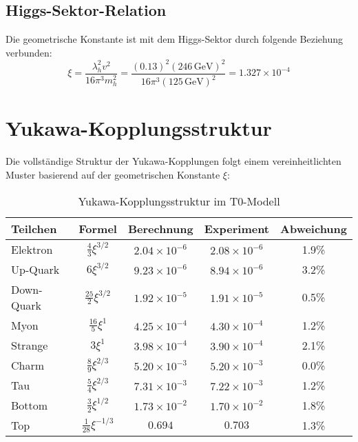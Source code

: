 \documentclass[12pt,a4paper]{article}
\newcommand{\xigeom}{\xi}
\begin{document}
	\subsection{Higgs-Sektor-Relation}
	
	Die geometrische Konstante ist mit dem Higgs-Sektor durch folgende Beziehung verbunden:
	\begin{equation}
		\xigeom = \frac{\lambda_h^2 v^2}{16\pi^3 m_h^2} = \frac{(0.13)^2 (246\,\text{GeV})^2}{16\pi^3 (125\,\text{GeV})^2} = 1.327 \times 10^{-4}
	\end{equation}
	
	\section{Yukawa-Kopplungsstruktur}
	
	Die vollständige Struktur der Yukawa-Kopplungen folgt einem vereinheitlichten Muster basierend auf der geometrischen Konstante $\xigeom$:
	
	\begin{table}[H]
		\centering
		\caption{Yukawa-Kopplungsstruktur im T0-Modell}
		\begin{tabular}{@{}lcccc@{}}
			\toprule
			\textbf{Teilchen} & \textbf{Formel} & \textbf{Berechnung} & \textbf{Experiment} & \textbf{Abweichung} \\
			\midrule
			Elektron & $\frac{4}{3}\xigeom^{3/2}$ & $2.04 \times 10^{-6}$ & $2.08 \times 10^{-6}$ & 1.9\% \\
			Up-Quark & $6\xigeom^{3/2}$ & $9.23 \times 10^{-6}$ & $8.94 \times 10^{-6}$ & 3.2\% \\
			Down-Quark & $\frac{25}{2}\xigeom^{3/2}$ & $1.92 \times 10^{-5}$ & $1.91 \times 10^{-5}$ & 0.5\% \\
			Myon & $\frac{16}{5}\xigeom^1$ & $4.25 \times 10^{-4}$ & $4.30 \times 10^{-4}$ & 1.2\% \\
			Strange & $3\xigeom^1$ & $3.98 \times 10^{-4}$ & $3.90 \times 10^{-4}$ & 2.1\% \\
			Charm & $\frac{8}{9}\xigeom^{2/3}$ & $5.20 \times 10^{-3}$ & $5.20 \times 10^{-3}$ & 0.0\% \\
			Tau & $\frac{5}{4}\xigeom^{2/3}$ & $7.31 \times 10^{-3}$ & $7.22 \times 10^{-3}$ & 1.2\% \\
			Bottom & $\frac{3}{2}\xigeom^{1/2}$ & $1.73 \times 10^{-2}$ & $1.70 \times 10^{-2}$ & 1.8\% \\
			Top & $\frac{1}{28}\xigeom^{-1/3}$ & $0.694$ & $0.703$ & 1.3\% \\
			\bottomrule
		\end{tabular}
	\end{table}
	
\end{document}
